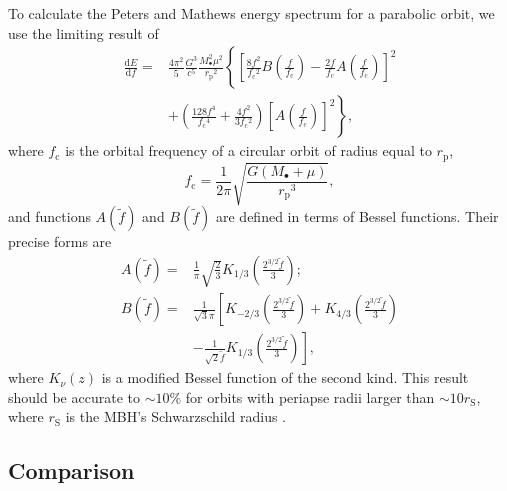 \documentclass[useAMS,usedcolumn,usegraphicx,usenatbib]{mn2e}
\newcommand{\sub}[1]{\ensuremath{_\mathrm{#1}}}
\newcommand{\dd}{\ensuremath{\mathrm{d}}}
\newcommand{\diff}[2]{\ensuremath{\frac{\dd {#1}}{\dd {#2}}}}
\newcommand{\recip}[1]{\ensuremath{\frac{1}{#1}}}
\begin{document}
To calculate the Peters and Mathews energy spectrum for a parabolic orbit, we use the limiting result of \citet{Turner1977}
\begin{align}
\diff{E}{f} = {} & \frac{4\pi^2}{5}\frac{G^3}{c^5}\frac{M_\bullet^2\mu^2}{r\sub{p}^2}\left\{\left[\frac{8f^2}{f\sub{c}^2}B\left(\frac{f}{f\sub{c}}\right) - \frac{2f}{f\sub{c}}A\left(\frac{f}{f\sub{c}}\right)\right]^2 \right. \nonumber \\
 & \left. + \left(\frac{128f^4}{f\sub{c}^4} + \frac{4f^2}{3f\sub{c}^2}\right)\left[A\left(\frac{f}{f\sub{c}}\right)\right]^2\right\},
\label{eq:PM_dEdf}
\end{align}
where $f\sub{c}$ is the orbital frequency of a circular orbit of radius equal to $r\sub{p}$,
\begin{equation}
f\sub{c} = \recip{2\pi}\sqrt{\frac{G(M_\bullet + \mu)}{r\sub{p}^3}},
\end{equation}
and functions $A(\widetilde{f})$ and $B(\widetilde{f})$ are defined in terms of Bessel functions. Their precise forms are \citep{Berry2010}
\begin{align}
A(\widetilde{f}) = {} & \recip{\pi}\sqrt{\frac{2}{3}}K_{1/3}\left(\frac{2^{3/2}\widetilde{f}}{3}\right); \\
B(\widetilde{f}) = {} & \recip{\sqrt{3}\pi}\left[K_{-2/3}\left(\frac{2^{3/2}\widetilde{f}}{3}\right) + K_{4/3}\left(\frac{2^{3/2}\widetilde{f}}{3}\right) \right. \nonumber \\
 {} & - \left. \recip{\sqrt{2}\widetilde{f}}K_{1/3}\left(\frac{2^{3/2}\widetilde{f}}{3}\right)\right],
\end{align}
where $K_\nu(z)$ is a modified Bessel function of the second kind. This result should be accurate to $\sim10\%$ for orbits with periapse radii larger than $\sim10r\sub{S}$, where $r\sub{S}$ is the MBH's Schwarzschild radius \citep{Berry2010}.

\subsection{Comparison}
\end{document}
